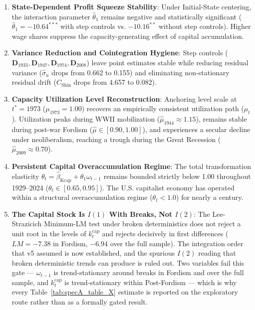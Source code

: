 \documentclass[11pt,a4paper]{article}
\begin{document}
\begin{enumerate}
    \item \textbf{State-Dependent Profit Squeeze Stability}: Under Initial-State centering, the interaction parameter $\hat{\theta}_1$ remains negative and statistically significant ($\hat{\theta}_1 = -10.64^{***}$ with step controls vs. $-10.16^{**}$ without step controls). Higher wage shares suppress the capacity-generating effect of capital accumulation.
    \item \textbf{Variance Reduction and Cointegration Hygiene}: Step controls ($\mathbf{D}_{1933}, \mathbf{D}_{1947}, \mathbf{D}_{1974}, \mathbf{D}_{2008}$) leave point estimates stable while reducing residual variance ($\hat{\sigma}_u$ drops from 0.662 to 0.155) and eliminating non-stationary residual drift ($C_{\text{Shin}}$ drops from 4.657 to 0.082).
    \item \textbf{Capacity Utilization Level Reconstruction}: Anchoring level scale at $t^* = 1973$ ($\mu_{1973} = 1.00$) recovers an empirically consistent utilization path ($\hat{\mu}_t$). Utilization peaks during WWII mobilization ($\hat{\mu}_{1944} \approx 1.15$), remains stable during post-war Fordism ($\hat{\mu} \in [0.90, 1.00]$), and experiences a secular decline under neoliberalism, reaching a trough during the Great Recession ($\hat{\mu}_{2009} \approx 0.70$).
    \item \textbf{Persistent Capital Overaccumulation Regime}: The total transformation elasticity $\theta_t = \hat{\beta}_{\text{Kcap}} + \hat{\theta}_1 \omega_{t-1}$ remains bounded strictly below 1.00 throughout 1929--2024 ($\theta_t \in [0.65, 0.95]$). The U.S. capitalist economy has operated within a structural overaccumulation regime ($\theta_t < 1.0$) for nearly a century.
    \item \textbf{The Capital Stock Is $I(1)$ With Breaks, Not $I(2)$}: The Lee-Strazicich Minimum-LM test under broken deterministics does not reject a unit root in the levels of $k_t^{\text{cap}}$ and rejects decisively in first differences ($LM = -7.38$ in Fordism, $-6.94$ over the full sample). The integration order that v5 assumed is now established, and the spurious $I(2)$ reading that broken deterministic trends can produce is ruled out. Two variables fail this gate --- $\omega_{t-1}$ is trend-stationary around breaks in Fordism and over the full sample, and $k_t^{\text{cap}}$ is trend-stationary within Post-Fordism --- which is why every Table~\ref{tab:specA_table_X} estimate is reported on the exploratory route rather than as a formally gated result.

\end{enumerate}
\end{document}

